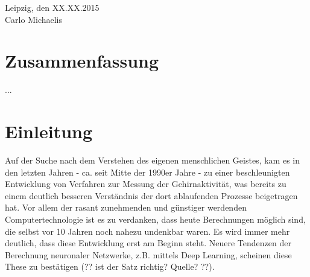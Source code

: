 \documentclass[doc,a4paper,12pt]{apa6}
\begin{document}
\vspace{3em}
\noindent Leipzig, den XX.XX.2015\\ Carlo Michaelis

\newpage

\section*{Zusammenfassung}

...

\newpage

\setcounter{tocdepth}{2}
\tableofcontents
\newpage

\listoffigures
\newpage

\section{Einleitung}

Auf der Suche nach dem Verstehen des eigenen menschlichen Geistes, kam es in den letzten Jahren - ca. seit Mitte der 1990er Jahre - zu einer beschleunigten Entwicklung von Verfahren zur Messung der Gehirnaktivität, was bereits zu einem deutlich besseren Verständnis der dort ablaufenden Prozesse beigetragen hat. Vor allem der rasant zunehmenden und günstiger werdenden Computertechnologie ist es zu verdanken, dass heute Berechnungen möglich sind, die selbst vor 10 Jahren noch nahezu undenkbar waren. Es wird immer mehr deutlich, dass diese Entwicklung erst am Beginn steht. Neuere Tendenzen der Berechnung neuronaler Netzwerke, z.B. mittels Deep Learning, scheinen diese These zu bestätigen (?? ist der Satz richtig? Quelle? ??).
\end{document}
